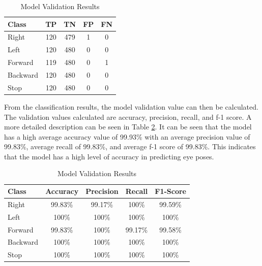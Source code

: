 \begin{table}[H]
  \caption{Model Validation Results}
  \label{tb:cm_model} 
  \centering
  \begin{tabular}{|l|c|c|c|c|}
  \hline
  \rowcolor[HTML]{C0C0C0} 
  \textbf{Class} & \textbf{TP} & \textbf{TN} & \textbf{FP} & \textbf{FN} \\ \hline
  Right    & 120          & 479         & 1           & 0           \\ \hline
  Left      & 120          & 480         & 0           & 0           \\ \hline
  Forward      & 119          & 480         & 0           & 1           \\ \hline
  Backward     & 120          & 480         & 0           & 0           \\ \hline
  Stop  & 120          & 480         & 0           & 0           \\ \hline
  \end{tabular}
\end{table}

From the classification results, the model validation value can then be calculated. The validation values calculated are accuracy, precision, recall, and f-1 score. A more detailed description can be seen in Table \ref{tb:vs_model}. It can be seen that the model has a high average accuracy value of 99.93\% with an average precision value of 99.83\%, average recall of 99.83\%, and average f-1 score of 99.83\%. This indicates that the model has a high level of accuracy in predicting eye poses.

\begin{table}[H]
  \caption{Model Validation Results}
  \label{tb:vs_model} 
  \centering
  \begin{tabular}{|l|c|c|c|c|}
  \hline
  \rowcolor[HTML]{C0C0C0} 
  \textbf{Class} & \textbf{Accuracy} & \textbf{Precision} & \textbf{Recall} & \textbf{F1-Score} \\ \hline
  Right    & 99.83\%            & 99.17\%             & 100\%           & 99.59\%            \\ \hline
  Left     & 100\%          & 100\%           & 100\%           & 100\%           \\ \hline
  Forward      & 99.83\%          & 100\%           & 99.17\%          & 99.58\%          \\ \hline
  Backward     & 100\%            & 100\%             & 100\%           & 100\%            \\ \hline
  Stop  & 100\%            & 100\%             & 100\%           & 100\%            \\ \hline
  \end{tabular}
\end{table}

